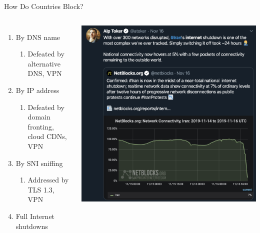 \documentclass[nobackground,dvipsnames,table,aspectratio=169]{beamer}
\begin{document}
\begin{frame}{How Do Countries Block?}
    \begin{columns}
            \begin{enumerate}
                \item By DNS name
                \begin{enumerate}
                    \item \small{Defeated by alternative DNS, VPN}
                \end{enumerate}
        
                \item By IP address
                \begin{enumerate}
                    \item \small{Defeated by domain fronting, cloud CDNs, VPN}
                \end{enumerate}
        
                \item By SNI sniffing
                \begin{enumerate}
                    \item \small{Addressed by TLS 1.3, VPN}
                \end{enumerate}
        
                \item Full Internet shutdowns
            \end{enumerate}
            \includegraphics[width=\textwidth]{iran-internet-shutdown-2019}
    \end{columns}
\end{frame}
\end{document}
